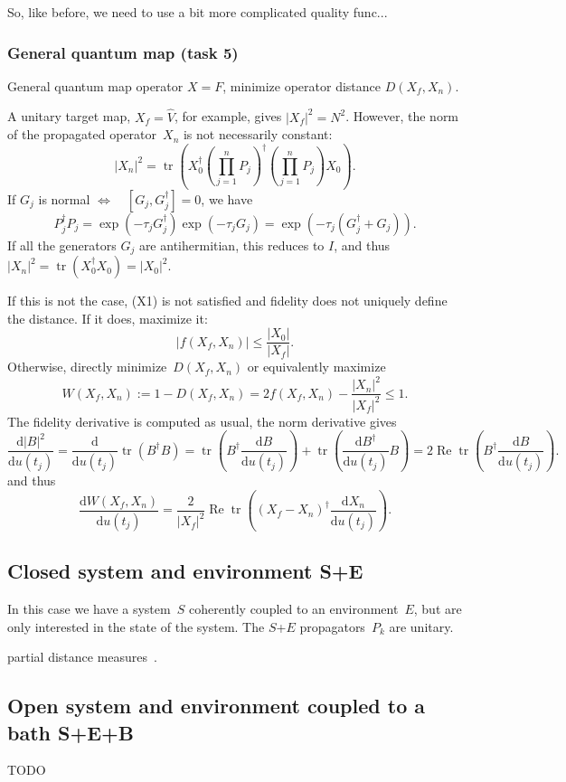 \documentclass[aps, pra, a4paper, longbibliography]{revtex4}
\newcommand{\I}{I}
\newcommand{\be}{\begin{equation}}
\newcommand{\ee}{\end{equation}}
\newcommand{\eq}{\Leftrightarrow}
\DeclareMathOperator{\tr}{tr}
\DeclareMathOperator{\re}{Re}
\newcommand{\dd}[2]{\frac{\mathrm{d} #1}{\mathrm{d} #2}}
\begin{document}
So, like before, we need to use a bit more complicated quality func...



\subsubsection{General quantum map (task 5)}

General quantum map operator $X = F$,
minimize operator distance $D(X_f, X_n)$.

A unitary target map,
$X_f = \hat{V}$, for example, gives $|X_f|^2 = N^2$.
However, the norm of the propagated operator~$X_n$ is not necessarily constant:
\be
|X_n|^2 = \tr\left(X_0^\dagger \left(\prod_{j=1}^{n} P_j\right)^\dagger \left(\prod_{j=1}^{n} P_j\right) X_0\right).
\ee
If $G_j$ is normal $\eq \quad [G_j, G^\dagger_j] = 0$, we have
\be
P_j^\dagger P_j
= \exp(-\tau_j G^\dagger_j) \exp(-\tau_j G_j)
= \exp(-\tau_j (G_j^\dagger + G_j)).
\ee
If all the generators $G_j$ are antihermitian, this reduces to $\I$, and thus
$|X_n|^2 = \tr(X_0^\dagger X_0) = |X_0|^2$.

If this is not the case, (X1) is not satisfied and fidelity does not uniquely define the distance.
If it does, maximize it:
\be
|f(X_f, X_n)| \le \frac{|X_0|}{|X_f|}.
\ee
Otherwise, directly minimize~$D(X_f, X_n)$
or equivalently maximize
\be
W(X_f,X_n) := 1 - D(X_f, X_n) = 2 f(X_f, X_n) -\frac{|X_n|^2}{|X_f|^2} \le 1.
\ee
The fidelity derivative is computed as usual, the norm derivative gives
\be
\dd{|B|^2}{u(t_j)}
= \dd{}{u(t_j)} \tr(B^\dagger B)
= \tr\left(B^\dagger \dd{B}{u(t_j)}\right)
+\tr\left(\dd{B^\dagger}{u(t_j)} B \right)
= 2 \re \tr\left(B^\dagger \dd{B}{u(t_j)}\right).
\ee
and thus
\be
\dd{W(X_f, X_n)}{u(t_j)}
= \frac{2}{|X_f|^2} \re \tr\left((X_f-X_n)^\dagger \dd{X_n}{u(t_j)}\right).
\ee


\subsection{Closed system and environment S+E}

In this case we have a system~$S$ coherently coupled to an
environment~$E$, but are only interested in the state of the system.
The $S$+$E$ propagators~$P_k$ are unitary.

partial distance measures~\cite{kosut_2006}.

\subsection{Open system and environment coupled to a bath S+E+B}

TODO




\end{document}
